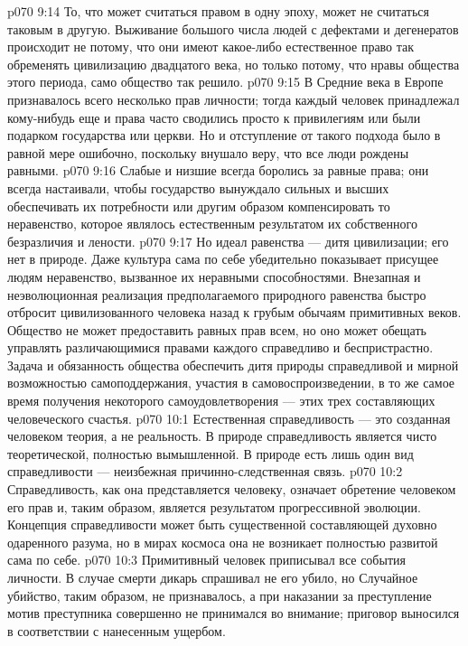 \vs p070 9:14 То, что может считаться правом в одну эпоху, может не считаться таковым в другую. Выживание большого числа людей с дефектами и дегенератов происходит не потому, что они имеют какое\hyp{}либо естественное право так обременять цивилизацию двадцатого века, но только потому, что нравы общества этого периода, само общество так решило.
\vs p070 9:15 В Средние века в Европе признавалось всего несколько прав личности; тогда каждый человек принадлежал кому\hyp{}нибудь еще и права часто сводились просто к привилегиям или были подарком государства или церкви. Но и отступление от такого подхода было в равной мере ошибочно, поскольку внушало веру, что все люди рождены равными.
\vs p070 9:16 Слабые и низшие всегда боролись за равные права; они всегда настаивали, чтобы государство вынуждало сильных и высших обеспечивать их потребности или другим образом компенсировать то неравенство, которое являлось естественным результатом их собственного безразличия и лености.
\vs p070 9:17 Но идеал равенства --- дитя цивилизации; его нет в природе. Даже культура сама по себе убедительно показывает присущее людям неравенство, вызванное их неравными способностями. Внезапная и неэволюционная реализация предполагаемого природного равенства быстро отбросит цивилизованного человека назад к грубым обычаям примитивных веков. Общество не может предоставить равных прав всем, но оно может обещать управлять различающимися правами каждого справедливо и беспристрастно. Задача и обязанность общества обеспечить дитя природы справедливой и мирной возможностью самоподдержания, участия в самовоспроизведении, в то же самое время получения некоторого самоудовлетворения --- этих трех составляющих человеческого счастья.
\vs p070 10:1 Естественная справедливость --- это созданная человеком теория, а не реальность. В природе справедливость является чисто теоретической, полностью вымышленной. В природе есть лишь один вид справедливости --- неизбежная причинно\hyp{}следственная связь.
\vs p070 10:2 Справедливость, как она представляется человеку, означает обретение человеком его прав и, таким образом, является результатом прогрессивной эволюции. Концепция справедливости может быть существенной составляющей духовно одаренного разума, но в мирах космоса она не возникает полностью развитой сама по себе.
\vs p070 10:3 Примитивный человек приписывал все события личности. В случае смерти дикарь спрашивал не  его убило, но  Случайное убийство, таким образом, не признавалось, а при наказании за преступление мотив преступника совершенно не принимался во внимание; приговор выносился в соответствии с нанесенным ущербом.
